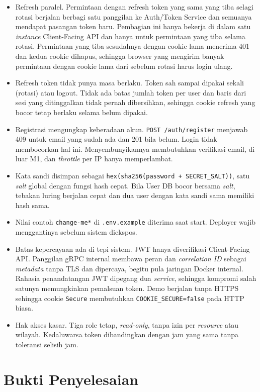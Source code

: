 \begin{itemize}
\item
  Refresh paralel. Permintaan dengan refresh token yang sama yang tiba selagi rotasi berjalan berbagi satu panggilan ke Auth/Token Service dan semuanya mendapat pasangan token baru. Pembagian ini hanya bekerja di dalam satu \textit{instance} Client-Facing API dan hanya untuk permintaan yang tiba selama rotasi. Permintaan yang tiba sesudahnya dengan cookie lama menerima 401 dan kedua cookie dihapus, sehingga browser yang mengirim banyak permintaan dengan cookie lama dari sebelum rotasi harus login ulang.
\item
  Refresh token tidak punya masa berlaku. Token sah sampai dipakai sekali (rotasi) atau logout. Tidak ada batas jumlah token per user dan baris dari sesi yang ditinggalkan tidak pernah dibersihkan, sehingga cookie refresh yang bocor tetap berlaku selama belum dipakai.
\item
  Registrasi mengungkap keberadaan akun. \texttt{POST /auth/register} menjawab 409 untuk email yang sudah ada dan 201 bila belum. Login tidak membocorkan hal ini. Menyembunyikannya membutuhkan verifikasi email, di luar M1, dan \textit{throttle} per IP hanya memperlambat.
\item
  Kata sandi disimpan sebagai \texttt{hex(sha256(password + SECRET\_SALT))}, satu \textit{salt} global dengan fungsi hash cepat. Bila User DB bocor bersama \textit{salt}, tebakan luring berjalan cepat dan dua user dengan kata sandi sama memiliki hash sama.
\item
  Nilai contoh \texttt{change-me*} di \texttt{.env.example} diterima saat start. Deployer wajib menggantinya sebelum sistem diekspos.
\item
  Batas kepercayaan ada di tepi sistem. JWT hanya diverifikasi Client-Facing API. Panggilan gRPC internal membawa peran dan \textit{correlation ID} sebagai \textit{metadata} tanpa TLS dan dipercaya, begitu pula jaringan Docker internal. Rahasia penandatangan JWT dipegang dua \textit{service}, sehingga kompromi salah satunya memungkinkan pemalsuan token. Demo berjalan tanpa HTTPS sehingga cookie \texttt{Secure} membutuhkan \texttt{COOKIE\_SECURE=false} pada HTTP biasa.
\item
  Hak akses kasar. Tiga role tetap, \textit{read-only}, tanpa izin per \textit{resource} atau wilayah. Kedaluwarsa token dibandingkan dengan jam yang sama tanpa toleransi selisih jam.
\end{itemize}

\section{Bukti Penyelesaian}

